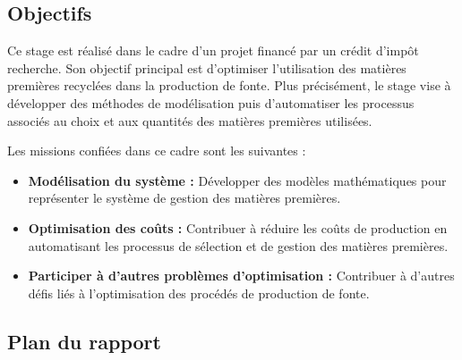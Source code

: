 \documentclass[12pt]{article}
\begin{document}
\subsection{Objectifs}

Ce stage est réalisé dans le cadre d'un projet financé par un crédit 
d'impôt recherche. Son objectif principal est d'optimiser l'utilisation 
des matières premières recyclées dans la production de fonte. Plus 
précisément, le stage vise à développer des méthodes de modélisation puis 
d'automatiser les processus associés au choix et aux quantités des matières
premières utilisées.

Les missions confiées dans ce cadre sont les suivantes :

\begin{itemize}
\item \textbf{Modélisation du système :} Développer des modèles mathématiques pour représenter le système de gestion des matières premières.
\item \textbf{Optimisation des coûts :} Contribuer à réduire les coûts de production en automatisant les processus de sélection et de gestion des matières premières.
\item \textbf{Participer à d'autres problèmes d'optimisation :} Contribuer à d'autres défis liés à l'optimisation des procédés de production de fonte.
\end{itemize}

\subsection{Plan du rapport}



 

\end{document}
